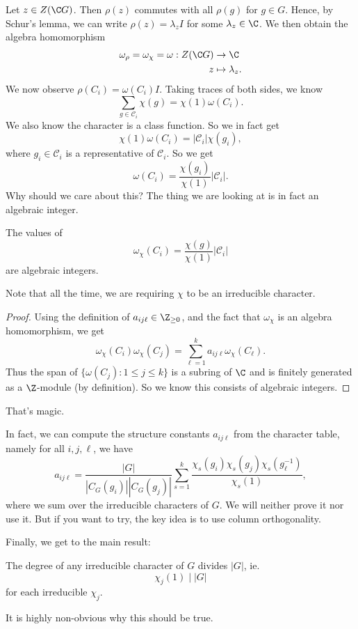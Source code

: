 \documentclass[a4paper]{article}
\begin{document}
Let $z \in Z(\C G)$. Then $\rho(z)$ commutes with all $\rho(g)$ for $g \in G$. Hence, by Schur's lemma, we can write $\rho(z) = \lambda_z I$ for some $\lambda_z \in \C$. We then obtain the algebra homomorphism
\begin{align*}
  \omega_\rho = \omega_\chi= \omega: Z(\C G) &\to \C\\
  z &\mapsto \lambda_z.
\end{align*}
We now observe $\rho(C_i) = \omega(C_i) I$. Taking traces of both sides, we know
\[
  \sum_{g \in \mathcal{C}_i} \chi(g) = \chi(1) \omega(C_i).
\]
We also know the character is a class function. So we in fact get
\[
  \chi(1) \omega(C_i) = |\mathcal{C}_i| \chi(g_i),
\]
where $g_i \in \mathcal{C}_i$ is a representative of $\mathcal{C}_i$. So we get
\[
  \omega(C_i) = \frac{\chi(g_i)}{\chi(1)} |\mathcal{C}_i|.
\]
Why should we care about this? The thing we are looking at is in fact an algebraic integer.
\begin{lemma}
  The values of
  \[
    \omega_\chi(C_i) = \frac{\chi(g)}{\chi(1)} |\mathcal{C}_i|
  \]
  are algebraic integers.
\end{lemma}
Note that all the time, we are requiring $\chi$ to be an irreducible character.
\begin{proof}
  Using the definition of $a_{ij\ell} \in \Z_{\geq 0}$, and the fact that $\omega_\chi$ is an algebra homomorphism, we get
  \[
    \omega_\chi(C_i) \omega_\chi(C_j) = \sum_{\ell = 1}^k a_{ij\ell} \omega_\chi (C_\ell).
  \]
  Thus the span of $\{\omega(C_j): 1 \leq j \leq k\}$ is a subring of $\C$ and is finitely generated as a $\Z$-module (by definition). So we know this consists of algebraic integers.
\end{proof}
That's magic.

In fact, we can compute the structure constants $a_{ij\ell}$ from the character table, namely for all $i, j, \ell$, we have
\[
  a_{ij\ell} = \frac{|G|}{|C_G(g_i)||C_G(g_j)|}\sum_{s = 1}^k \frac{\chi_s (g_i) \chi_s(g_j) \chi_s(g_\ell^{-1})}{\chi_s(1)},
\]
where we sum over the irreducible characters of $G$. We will neither prove it nor use it. But if you want to try, the key idea is to use column orthogonality.

Finally, we get to the main result:
\begin{thm}
  The degree of any irreducible character of $G$ divides $|G|$, ie.
  \[
    \chi_j(1) \mid |G|
  \]
  for each irreducible $\chi_j$.
\end{thm}
It is highly non-obvious why this should be true.
\end{document}
